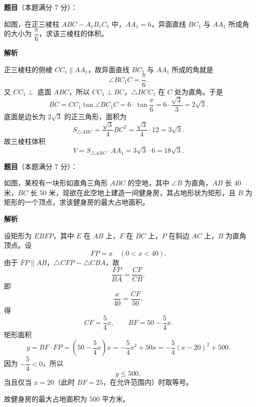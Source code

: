 \begin{answer}

\textbf{题目}（本题满分 7 分）：

如图，在正三棱柱 $ABC-A_1B_1C_1$ 中，$AA_1=6$，异面直线 $BC_1$ 与 $AA_1$ 所成角的大小为 $\dfrac\pi6$，求该三棱柱的体积。
\nopagebreak[4]
\begin{center}\end{center}
\nopagebreak[4]
\textbf{解析}

正三棱柱的侧棱 $CC_1\parallel AA_1$，故异面直线 $BC_1$ 与 $AA_1$ 所成的角就是
\nopagebreak[4]
\[\angle BC_1C=\frac\pi6.\]
又 $CC_1\perp$ 底面 $ABC$，所以 $CC_1\perp BC$，$\triangle BCC_1$ 在 $C$ 处为直角。于是
\nopagebreak[4]
\[BC=CC_1\tan\angle BC_1C=6\cdot\tan\frac\pi6=6\cdot\frac{\sqrt3}{3}=2\sqrt3.\]
底面是边长为 $2\sqrt3$ 的正三角形，面积为
\nopagebreak[4]
\[S_{\triangle ABC}=\frac{\sqrt3}{4}BC^2=\frac{\sqrt3}{4}\cdot12=3\sqrt3.\]
故三棱柱体积
\nopagebreak[4]
\[V=S_{\triangle ABC}\cdot AA_1=3\sqrt3\cdot6=18\sqrt3.\]


\end{answer}
\begin{answer}

\textbf{题目}（本题满分 7 分）：

如图，某校有一块形如直角三角形 $ABC$ 的空地，其中 $\angle B$ 为直角，$AB$ 长 $40$ 米，$BC$ 长 $50$ 米，现欲在此空地上建造一间健身房，其占地形状为矩形，且 $B$ 为矩形的一个顶点，求该健身房的最大占地面积。
\nopagebreak[4]
\begin{center}\end{center}
\nopagebreak[4]
\textbf{解析}

设矩形为 $EBFP$，其中 $E$ 在 $AB$ 上，$F$ 在 $BC$ 上，$P$ 在斜边 $AC$ 上，$B$ 为直角顶点。设
\nopagebreak[4]
\[FP=x\quad(0<x<40).\]
由于 $FP\parallel AB$，$\triangle CFP\sim\triangle CBA$，故
\nopagebreak[4]
\[\frac{FP}{BA}=\frac{CF}{CB},\]
即
\nopagebreak[4]
\[\frac{x}{40}=\frac{CF}{50},\]
得
\nopagebreak[4]
\[CF=\frac54x,\qquad BF=50-\frac54x.\]
矩形面积
\nopagebreak[4]
\[y=BF\cdot FP=\left(50-\frac54x\right)x
=-\frac54x^2+50x
=-\frac54(x-20)^2+500.\]
因为 $-\dfrac54<0$，所以
\nopagebreak[4]
\[y\leqslant500,\]
当且仅当 $x=20$（此时 $BF=25$，在允许范围内）时取等号。

故健身房的最大占地面积为 $500$ 平方米。


\end{answer}

